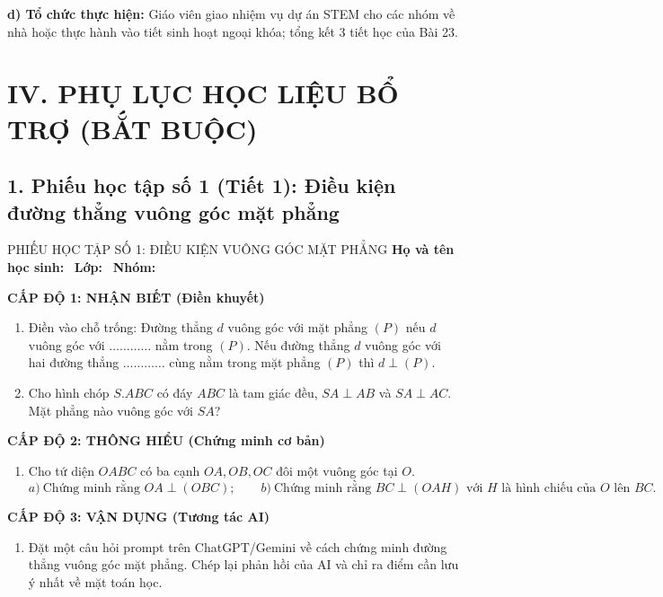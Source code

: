 \documentclass[12pt, a4paper]{article}
\begin{document}
\noindent \textbf{d) Tổ chức thực hiện:}
Giáo viên giao nhiệm vụ dự án STEM cho các nhóm về nhà hoặc thực hành vào tiết sinh hoạt ngoại khóa; tổng kết 3 tiết học của Bài 23.

\vspace{10pt}

\section*{IV. PHỤ LỤC HỌC LIỆU BỔ TRỢ (BẮT BUỘC)}

\subsection*{1. Phiếu học tập số 1 (Tiết 1): Điều kiện đường thẳng vuông góc mặt phẳng}

\begin{pedabox}{PHIẾU HỌC TẬP SỐ 1: ĐIỀU KIỆN VUÔNG GÓC MẶT PHẲNG}
\textbf{Họ và tên học sinh:} \dotfill \ \textbf{Lớp:} \dotfill \ \textbf{Nhóm:} \dotfill

\noindent \textbf{CẤP ĐỘ 1: NHẬN BIẾT (Điền khuyết)}
\begin{enumerate}[leftmargin=0.6cm]
    \item Điền vào chỗ trống:
    Đường thẳng $d$ vuông góc với mặt phẳng $(P)$ nếu $d$ vuông góc với $\dots\dots\dots\dots$ nằm trong $(P)$.
    Nếu đường thẳng $d$ vuông góc với hai đường thẳng $\dots\dots\dots\dots$ cùng nằm trong mặt phẳng $(P)$ thì $d \perp (P)$.
    \item Cho hình chóp $S.ABC$ có đáy $ABC$ là tam giác đều, $SA \perp AB$ và $SA \perp AC$. Mặt phẳng nào vuông góc với $SA$?
\end{enumerate}

\noindent \textbf{CẤP ĐỘ 2: THÔNG HIỂU (Chứng minh cơ bản)}
\begin{enumerate}[leftmargin=0.6cm]
    \item Cho tứ diện $OABC$ có ba cạnh $OA, OB, OC$ đôi một vuông góc tại $O$.
    $$a) \ \text{Chứng minh rằng } OA \perp (OBC); \qquad b) \ \text{Chứng minh rằng } BC \perp (OAH) \text{ với } H \text{ là hình chiếu của } O \text{ lên } BC.$$
\end{enumerate}

\noindent \textbf{CẤP ĐỘ 3: VẬN DỤNG (Tương tác AI)}
\begin{enumerate}[leftmargin=0.6cm]
    \item Đặt một câu hỏi prompt trên ChatGPT/Gemini về cách chứng minh đường thẳng vuông góc mặt phẳng. Chép lại phản hồi của AI và chỉ ra điểm cần lưu ý nhất về mặt toán học.
\end{enumerate}
\end{pedabox}
\end{document}
